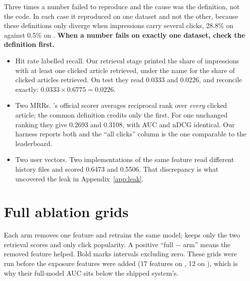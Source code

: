 Three times a number failed to reproduce and the cause was the definition, not the code. In each
case it reproduced on one dataset and not the other, because these definitions only diverge when
impressions carry several clicks, 28.8\% on \mind{} against 0.5\% on \eb{}. \textbf{When a number
fails on exactly one dataset, check the definition first.}

\begin{itemize}
\item Hit rate labelled recall. Our retrieval stage printed the share of impressions with
  at least one clicked article retrieved, under the name for the share of clicked articles
  retrieved. On \mind{} test they read 0.0333 and 0.0226, and reconcile exactly:
  $0.0333 \times 0.6775 = 0.0226$.
\item Two MRRs. \mind{}'s official scorer averages reciprocal rank over \emph{every}
  clicked article; the common definition credits only the first. For one unchanged ranking they
  give 0.2693 and 0.3108, with AUC and nDCG identical. Our harness reports both and the ``all
  clicks'' column is the one comparable to the leaderboard.
\item Two user vectors. Two implementations of the same feature read different history
  files and scored 0.6473 and 0.5506. That discrepancy is what uncovered the leak in
  Appendix~\ref{app:leak}.
\end{itemize}

\section{Full ablation grids}
\label{app:grids}

Each arm removes one feature and retrains the same model;  keeps only the two
retrieval scores and  only click popularity. A positive ``full $-$ arm'' means the
removed feature helped. Bold marks intervals excluding zero. These grids were run before the
exposure features were added (17 features on \eb{}, 12 on \mind{}), which is why their full-model
AUC sits below the shipped system's.

\begin{table}[t]
\centering\scriptsize

\caption{\eb{} small, 17-feature model, 64,365 val and 244,647 test impressions.}
\end{table}

\begin{table}[t]
\centering\scriptsize

\caption{\mind{} small, 12-feature model, 61,894 val and 73,152 test impressions.}
\end{table}

